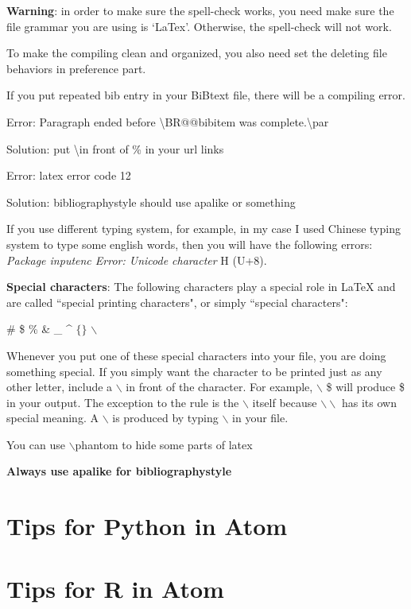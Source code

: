 \documentclass[12pt]{article}
\theoremstyle{definition}
\numberwithin{equation}{section}
\numberwithin{figure}{section}
\numberwithin{table}{section}
\begin{document}
\textbf{Warning}: in order to make sure the spell-check works, you need make sure the file grammar you are using is `LaTex'. Otherwise, the spell-check will not work.

To make the compiling clean and organized, you also need set the deleting file behaviors in preference part.

If you put repeated bib entry in your BiBtext file, there will be a compiling error.

Error: Paragraph ended before \textbackslash BR@@bibitem was complete.\textbackslash par

Solution: put \textbackslash in front of \% in your url links

Error: latex error code 12

Solution: bibliographystyle should use apalike or something

If you use different typing system, for example, in my case I used Chinese typing system to type some english words, then you will have the following errors:
\textit{Package inputenc Error: Unicode character} H (U+8).

\textbf{Special characters}: The following characters play a special role in LaTeX and are called ``special printing characters", or simply ``special characters":

\# \$ \% \&  \_ \^ $\{  \}$ $\backslash$

Whenever you put one of these special characters into your file, you are doing something special. If you simply want the character to be printed just as any other letter, include a $\backslash$ in front of the character. For example, $\backslash$ \$ will produce \$ in your output. The exception to the rule is the $\backslash$ itself because $\backslash \backslash$ has its own special meaning. A $\backslash$ is produced by typing $\backslash$ in your file.


You can use $\backslash$phantom to hide some parts of latex


\textbf{Always use apalike for bibliographystyle}

\section{Tips for Python in Atom}



\section{Tips for R in Atom }
\end{document}
